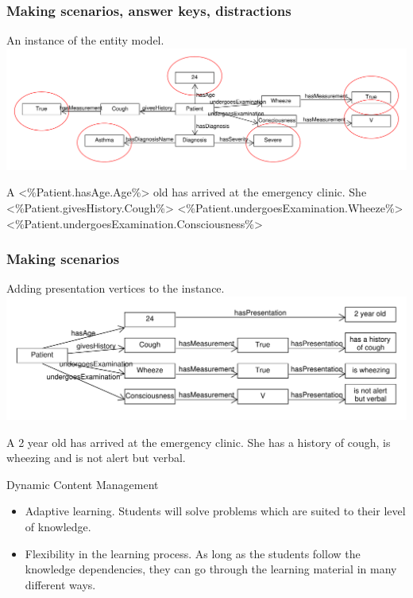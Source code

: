 \documentclass{beamer}
\begin{document}
\begin{frame}[fragile]
\frametitle{Making scenarios, answer keys, distractions}
An instance of the entity model.
\includegraphics[scale=0.35]{EntityInstanceGraph}
\begin{semiverbatim}
A <\%Patient.hasAge.Age\%> old has arrived at the 
emergency clinic.  
She <\%Patient.givesHistory.Cough\%> 
<\%Patient.undergoesExamination.Wheeze\%>
<\%Patient.undergoesExamination.Consciousness\%>
\end{semiverbatim}
\end{frame}

\begin{frame}[fragile]
\frametitle{Making scenarios}
Adding presentation vertices to the instance.
\includegraphics[scale=0.45]{PresentationEntityGraph}
\begin{semiverbatim}
	A 2 year old has arrived at the 
	emergency clinic.  
	She has a history of cough, 
	is wheezing
	and is not alert but verbal.
\end{semiverbatim}
\end{frame}

\begin{frame}{Dynamic Content Management}
\begin{itemize}
	\item Adaptive learning. Students will solve problems which are suited to their level of knowledge.
	\item Flexibility in the learning process. As long as the students follow the knowledge dependencies, they can go through the learning material in many different ways.
\end{itemize}
\end{frame}
\end{document}
